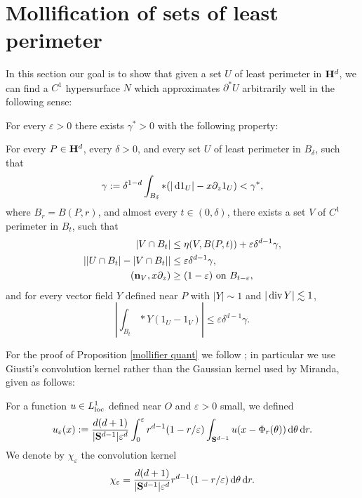 \section{Mollification of sets of least perimeter}\label{MollifierSection}
In this section our goal is to show that given a set $U$ of least perimeter in $\mathbf H^d$, we can find a $C^1$ hypersurface $N$ which approximates $\partial^* U$ arbitrarily well in the following sense:

\begin{proposition}\label{mollifier quant}
    For every $\varepsilon > 0$ there exists $\gamma^* > 0$ with the following property:

    For every $P \in \mathbf H^d$, every $\delta > 0$, and every set $U$ of least perimeter in $B_\delta$, such that
    \begin{equation}\label{bootstrap the mollifier}
    \gamma := \delta^{1 - d}\int_{B_\delta} *(|\mathop{}\!\mathrm{d} 1_U| - x\partial_z 1_U) < \gamma^*,
    \end{equation}
    where $B_r = B(P, r)$, and almost every $t \in (0, \delta)$, there exists a set $V$ of $C^1$ perimeter in $B_t$, such that
    \begin{align}
    |V \cap B_t| &\leq \eta(V, B(P, t)) + \varepsilon \delta^{d - 1} \gamma, \label{mollifier quant1}\\
    \left||U \cap B_t| - |V \cap B_t|\right| &\leq \varepsilon \delta^{d - 1} \gamma, \label{mollifier quant2}\\
    (\mathbf n_V, x\partial_z) &\geq (1 - \varepsilon) \text{ on } B_{t-\varepsilon}, \label{mollifier quant4}
    \end{align}
    and for every vector field $Y$ defined near $P$ with $|Y| \sim 1$ and $|\operatorname{div} Y| \lesssim 1$,
    \begin{equation}
    \left|\int_{B_t} *Y(1_U - 1_V)\right| \leq \varepsilon \delta^{d - 1} \gamma. \label{mollifier quant3}
    \end{equation}
\end{proposition}

For the proof of Proposition \ref{mollifier quant} we follow \cite[Chapter 7]{Giusti77}; in particular we use Giusti's convolution kernel rather than the Gaussian kernel used by Miranda, given as follows:

\begin{definition}
For a function $u \in L^1_{\mathrm{loc}}$ defined near $O$ and $\varepsilon > 0$ small, we defined
$$u_\varepsilon(x) := \frac{d(d + 1)}{|\mathbf S^{d - 1}| \varepsilon^d} \int_0^\varepsilon r^{d - 1}(1 - r/\varepsilon) \int_{\mathbf S^{d - 1}} u(x - \Phi_r(\theta)) \mathop{}\!\mathrm{d} \theta \mathop{}\!\mathrm{d} r.$$
We denote by $\chi_\varepsilon$ the convolution kernel
$$\chi_\varepsilon = \frac{d(d + 1)}{|\mathbf S^{d - 1}| \varepsilon^d}r^{d - 1}(1 - r/\varepsilon) \mathop{}\!\mathrm{d} \theta \mathop{}\!\mathrm{d} r.$$
\end{definition}

